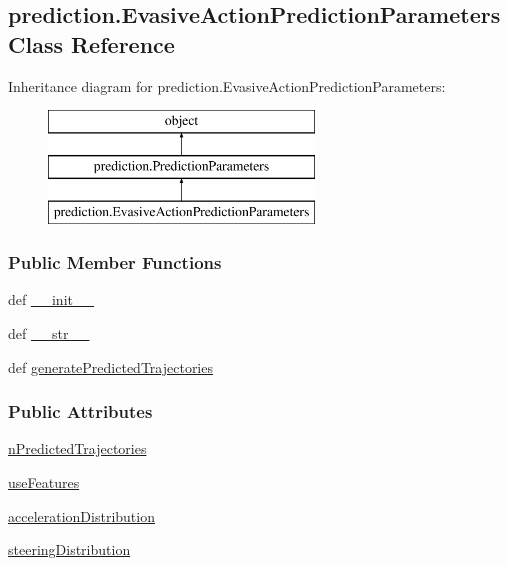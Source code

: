 \hypertarget{classprediction_1_1EvasiveActionPredictionParameters}{\subsection{prediction.\-Evasive\-Action\-Prediction\-Parameters Class Reference}
\label{classprediction_1_1EvasiveActionPredictionParameters}
}
Inheritance diagram for prediction.\-Evasive\-Action\-Prediction\-Parameters\-:\begin{figure}[H]
\begin{center}
\leavevmode
\includegraphics[height=3.000000cm]{classprediction_1_1EvasiveActionPredictionParameters}
\end{center}
\end{figure}
\subsubsection*{Public Member Functions}
\begin{DoxyCompactItemize}
\item 
def \hyperlink{classprediction_1_1EvasiveActionPredictionParameters_a98fc38dd46c873d5c2b0174353086870}{\-\_\-\-\_\-init\-\_\-\-\_\-}
\item 
def \hyperlink{classprediction_1_1EvasiveActionPredictionParameters_a61851834051a48bfcbf43a6310b2d3e3}{\-\_\-\-\_\-str\-\_\-\-\_\-}
\item 
def \hyperlink{classprediction_1_1EvasiveActionPredictionParameters_a3b6e8763a36f6549e547aba4a0c62982}{generate\-Predicted\-Trajectories}
\end{DoxyCompactItemize}
\subsubsection*{Public Attributes}
\begin{DoxyCompactItemize}
\item 
\hyperlink{classprediction_1_1EvasiveActionPredictionParameters_ace676c39fbf562303d7e9f2edf65d71c}{n\-Predicted\-Trajectories}
\item 
\hyperlink{classprediction_1_1EvasiveActionPredictionParameters_a998ff692327907d9b5f368fc5e3d906a}{use\-Features}
\item 
\hyperlink{classprediction_1_1EvasiveActionPredictionParameters_ab4638465c5d0cf8c4605b243d3f18ce9}{acceleration\-Distribution}
\item 
\hyperlink{classprediction_1_1EvasiveActionPredictionParameters_aee3f8965c1e1a9981a39c5626d61b022}{steering\-Distribution}
\end{DoxyCompactItemize}


